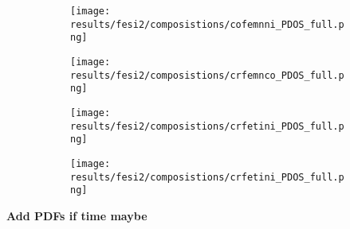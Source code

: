 \begin{figure}[H]
	\begin{subfigure}{.5\textwidth}
		\texttt{[image: results/fesi2/composistions/cofemnni\_PDOS\_full.png]}
		\caption{}
	\end{subfigure}
	\begin{subfigure}{.5\textwidth}
		\texttt{[image: results/fesi2/composistions/crfemnco\_PDOS\_full.png]}
		\caption{}
	\end{subfigure}
\end{figure}


\begin{figure}[H]
	\begin{subfigure}{.5\textwidth}
		\texttt{[image: results/fesi2/composistions/crfetini\_PDOS\_full.png]}
		\caption{}
	\end{subfigure}
	\begin{subfigure}{.5\textwidth}
		\texttt{[image: results/fesi2/composistions/crfetini\_PDOS\_full.png]}
		\caption{}
	\end{subfigure}
\end{figure}

\textbf{Add PDFs if time maybe}